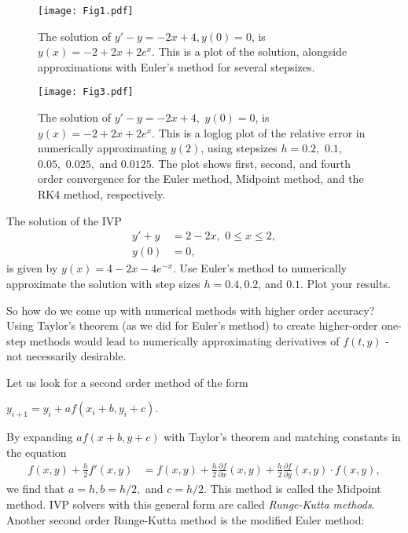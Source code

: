 \begin{figure}[ht]
\centering
\texttt{[image: Fig1.pdf]}
\caption{The solution of $y' -y= -2x+4, y(0) = 0$, is $y(x) = -2+2x + 2e^x.$ This is a plot of the solution, alongside approximations with Euler's method for several stepsizes.}
\label{ivp:euler}
\end{figure}

\begin{figure}[ht]
\centering
\texttt{[image: Fig3.pdf]}
\caption{The solution of $y' -y= -2x+4,$ $ y(0) = 0$, is $y(x) = -2+2x + 2e^x.$ This is a loglog plot of the relative error in numerically approximating $y(2)$, using stepsizes $h = 0.2,$ $0.1,$ $0.05,$ $0.025,$ and $0.0125$. The plot shows first, second, and fourth order convergence for the Euler method, Midpoint method, and the RK4 method, respectively.}
\label{ivp:relative_error}
\end{figure}

\begin{problem} The solution of the IVP
\begin{align*}
y' + y &= 2-2x,\,\, 0 \leq x \leq 2, \\
y(0) &= 0,
\end{align*}
is given by $y(x) = 4-2x -4e^{-x}$. 
Use Euler's method to numerically approximate the solution with step sizes $h = 0.4, 0.2$, and $0.1.$ Plot your results.
\end{problem}

So how do we come up with numerical methods with higher order accuracy? Using Taylor's theorem (as we did for Euler's method) to create higher-order one-step methods would lead to numerically approximating derivatives of $f(t,y)$ - not necessarily desirable. 

Let us look for a second order method of the form

$y_{i+1} = y_i + a f(x_i+b, y_i+c).$

By expanding $a f(x+b, y+c)$ with Taylor's theorem and matching constants in the equation
\begin{align*}
f(x,y) + \frac{h}{2}f'(x,y) &= f(x,y) + \frac{h}{2}\frac{\partial f}{\partial x}(x,y) + \frac{h}{2}\frac{\partial f}{\partial y}(x,y) \cdot f(x,y),
\end{align*}
we find that $a = h, b = h/2,$ and $c = h/2$. This method is called the Midpoint method. IVP solvers with this general form are called \textit{Runge-Kutta methods}. Another second order Runge-Kutta method is the modified Euler method: 


